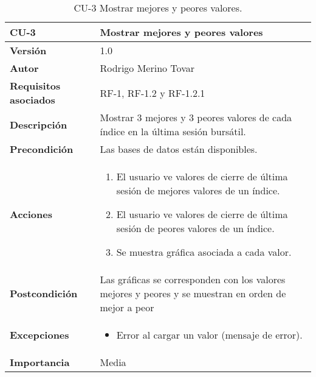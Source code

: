 \begin{table}[p]
	\centering
	\begin{tabularx}{\linewidth}{ p{} p{} }
		\toprule
		\textbf{CU-3}    & \textbf{Mostrar mejores y peores valores}\\
		\toprule
		\textbf{Versión}              & 1.0    \\
		\textbf{Autor}                & Rodrigo Merino Tovar \\
		\textbf{Requisitos asociados} & RF-1, RF-1.2 y RF-1.2.1 \\
		\textbf{Descripción}          & Mostrar 3 mejores y 3 peores valores de cada índice en la última sesión bursátil.\\
		\textbf{Precondición}         & Las bases de datos están disponibles. \\
		\textbf{Acciones}             &
		\begin{enumerate}
			\def\labelenumi{\arabic{enumi}.}
			\tightlist
			\item El usuario ve valores de cierre de última sesión de mejores valores de un 			índice. 
			\item El usuario ve valores de cierre de última sesión de peores valores de un 				índice. 
			\item Se muestra gráfica asociada a cada valor.
		\end{enumerate}\\
		\textbf{Postcondición}        & Las gráficas se corresponden con los valores 												mejores y peores y se muestran en orden de mejor a 											peor  \\
		\textbf{Excepciones}          & 
		\begin{itemize}
			\tightlist
			\item Error al cargar un valor (mensaje de error). 
		\end{itemize}\\
		\textbf{Importancia}          & Media \\
		\bottomrule
	\end{tabularx}
	\caption{CU-3 Mostrar mejores y peores valores.}
\end{table}


